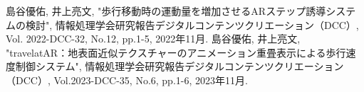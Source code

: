 %
%

\begin{theachievement}{99}
   島谷優佑, 井上亮文, "歩行移動時の運動量を増加させるARステップ誘導システムの検討", 情報処理学会研究報告デジタルコンテンツクリエーション（DCC）, Vol. 2022-DCC-32, No.12, pp.1-5, 2022年11月.
  島谷優佑, 井上亮文, "travelatAR：地表面近似テクスチャーのアニメーション重畳表示による歩行速度制御システム", 情報処理学会研究報告デジタルコンテンツクリエーション（DCC）, Vol.2023-DCC-35, No.6, pp.1-6, 2023年11月.
\end{theachievement}

